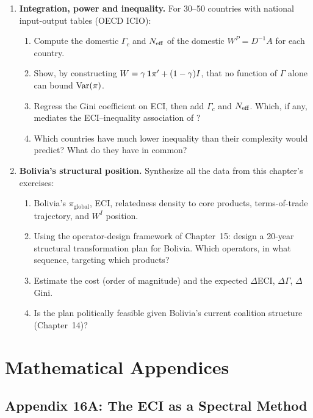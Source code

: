 \documentclass[../structural_economics_book.tex]{subfiles}
\begin{document}
\begin{enumerate}[label=\textbf{16.\arabic*}, leftmargin=3em]
\item \textbf{Integration, power and inequality.}\label{ch16:ex:bound} For 30--50 countries with national input-output tables (OECD ICIO):
\begin{enumerate}
\item Compute the domestic $\Gamma_c$ and $N_{\text{eff}}$ of the domestic $W^P = D^{-1}A$ for each country.
\item Show, by constructing $W = \gamma\,\mathbf{1}\pi' + (1-\gamma)I$, that no function of $\Gamma$ alone can bound $\operatorname{Var}(\pi)$.
\item Regress the Gini coefficient on ECI, then add $\Gamma_c$ and $N_{\text{eff}}$. Which, if any, mediates the ECI--inequality association of \citet{hartmann2017linking}?
\item Which countries have much lower inequality than their complexity would predict? What do they have in common?
\end{enumerate}

\item \textbf{Bolivia's structural position.} Synthesize all the data from this chapter's exercises:
\begin{enumerate}
\item Bolivia's $\pi_{\text{global}}$, ECI, relatedness density to core products, terms-of-trade trajectory, and $W^I$ position.
\item Using the operator-design framework of Chapter~15: design a 20-year structural transformation plan for Bolivia. Which operators, in what sequence, targeting which products?
\item Estimate the cost (order of magnitude) and the expected $\Delta$ECI, $\Delta\Gamma$, $\Delta$Gini.
\item Is the plan politically feasible given Bolivia's current coalition structure (Chapter~14)?
\end{enumerate}
\end{enumerate}


\newpage
\section*{Mathematical Appendices}


\subsection*{Appendix 16A: The ECI as a Spectral Method}
\label{ch16:app:ECI}
\end{document}
